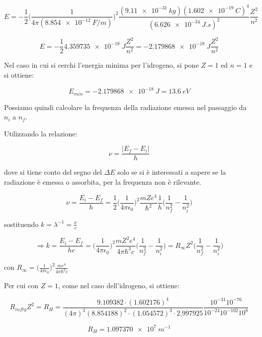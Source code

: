 $$ E = - \frac{1}{2} \biggl(\frac{1}{4\pi (\SI{8.854e-12}{F/m})}\biggr)^2 \frac{(\SI{9.11e-31}{kg}) (\SI{1.602e-19}{C})^4 }{(\SI{6.626e-34}{J.s})^2} \frac{Z^2}{n^2}  $$

$$ E = - \frac{1}{2} \SI{4.359735e-18}{J} \frac{Z^2}{n^2} = - \SI{2.179868e-18}{J} \frac{Z^2}{n^2} $$

Nel caso in cui si cerchi l'energia minima per l'idrogeno, si pone $Z=1$ ed $n=1$ e si ottiene:

$$ E_{min} = \SI{-2.179868e-18}{J} = \SI{13.6}{eV} $$

Possiamo quindi calcolare la frequenza della radiazione emessa nel passaggio da $n_i$ a $n_f$. 

Utilizzando la relazione:

$$\nu = \frac{|E_f - E_i|}{h}$$ 

dove si tiene conto del segno del $\Delta E$ solo se si è interessati a sapere se la radiazione è emessa o assorbita, per la frequenza non è rilevante.

$$ \nu= \frac{E_i-E_f}{h} = \frac{1}{2} \biggl(\frac{1}{4\pi\epsilon_0}\biggr)^2 \frac{m Z e^4}{\hbar^2} \frac{1}{h} \biggl(\frac{1}{n_f^2} - \frac{1}{n_i^2} \biggr)   $$


sostituendo $k = \lambda^{-1} = \frac{\nu}{c}$ 

$$ \Rightarrow k = \frac{E_i-E_f}{hc} = \biggl(\frac{1}{4\pi\epsilon_0}\biggr)^2 \frac{m Z^2 e^4}{4\pi\hbar^3 c} \biggl(\frac{1}{n_f^2} - \frac{1}{n_i^2} \biggr) = R_{\infty} Z^2 \biggl(\frac{1}{n_f^2} - \frac{1}{n_i^2} \biggr) $$

con $R_{\infty} =\bigl(\frac{1}{4\pi\epsilon_0}\bigr)^2 \frac{m e^4}{4\pi\hbar^3 c} $

Per cui con $Z=1$, come nel caso dell'idrogeno, si ottiene:

$$ R_{infty} Z^2 = R_{H} = \frac{9.109382 \cdot (1.602176)^4}{(4\pi)^3 (8.854188)^2 \cdot (1.054572)^3 \cdot 2.997925 } \frac{ 10^{-31} 10^{-76} } { 10^{-24} 10^{-102} 10^{8} }$$

$$ R_{H} = \SI{1.097370e7}{m^{-1}} $$

